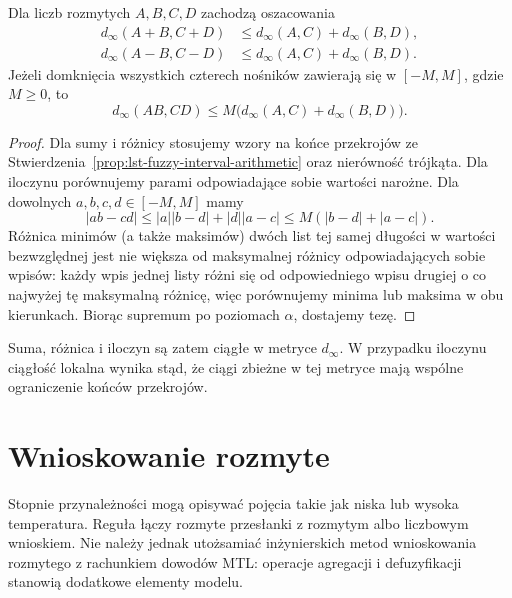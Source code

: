 \begin{stwierdzenie}
\label{prop:ncl-fuzzy-metric-arithmetic}
Dla liczb rozmytych $A,B,C,D$ zachodzą oszacowania
\[
\begin{aligned}
 d_\infty(A+B,C+D)&\leq d_\infty(A,C)+d_\infty(B,D),\\
 d_\infty(A-B,C-D)&\leq d_\infty(A,C)+d_\infty(B,D).
\end{aligned}
\]
Jeżeli domknięcia wszystkich czterech nośników
zawierają się w $[-M,M]$, gdzie $M\geq0$, to
\[
 d_\infty(AB,CD)\leq
 M\bigl(d_\infty(A,C)+d_\infty(B,D)\bigr).
\]
\end{stwierdzenie}
\begin{proof}
Dla sumy i różnicy stosujemy wzory na końce
przekrojów ze
Stwierdzenia~\ref{prop:lst-fuzzy-interval-arithmetic}
oraz nierówność trójkąta.
Dla iloczynu porównujemy parami odpowiadające sobie
wartości narożne. Dla dowolnych $a,b,c,d\in[-M,M]$
mamy
\[
 |ab-cd|\leq |a||b-d|+|d||a-c|
 \leq M(|b-d|+|a-c|).
\]
Różnica minimów (a także maksimów) dwóch list
tej samej długości w wartości bezwzględnej jest
nie większa od maksymalnej różnicy odpowiadających
sobie wpisów: każdy wpis jednej listy różni się
od odpowiedniego wpisu drugiej o co najwyżej
tę maksymalną różnicę, więc porównujemy minima
lub maksima w obu kierunkach.
Biorąc supremum po poziomach $\alpha$, dostajemy tezę.
\end{proof}
Suma, różnica i iloczyn są zatem ciągłe w metryce
$d_\infty$. W przypadku iloczynu ciągłość lokalna
wynika stąd, że ciągi zbieżne w tej metryce
mają wspólne ograniczenie końców przekrojów.

\section{Wnioskowanie rozmyte}
Stopnie przynależności mogą opisywać pojęcia takie jak
niska lub wysoka temperatura. Reguła łączy rozmyte
przesłanki z rozmytym albo liczbowym wnioskiem.
Nie należy jednak utożsamiać inżynierskich metod
wnioskowania rozmytego z rachunkiem dowodów MTL:
operacje agregacji i defuzyfikacji stanowią dodatkowe
elementy modelu.

